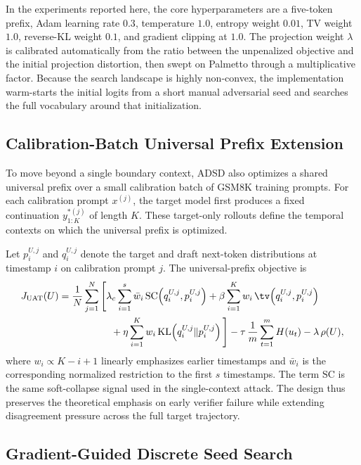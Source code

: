 In the experiments reported here, the core hyperparameters are a five-token
prefix, Adam learning rate $0.3$, temperature $1.0$, entropy weight $0.01$, TV
weight $1.0$, reverse-KL weight $0.1$, and gradient clipping at $1.0$. The
projection weight $\lambda$ is calibrated automatically from the ratio between
the unpenalized objective and the initial projection distortion, then swept on
Palmetto through a multiplicative factor. Because the search landscape is
highly non-convex, the implementation warm-starts the initial logits from a
short manual adversarial seed and searches the full vocabulary around that
initialization.

\subsection{Calibration-Batch Universal Prefix Extension}

To move beyond a single boundary context, ADSD also optimizes a shared
universal prefix over a small calibration batch of GSM8K training prompts. For
each calibration prompt $x^{(j)}$, the target model first produces a fixed
continuation $y^{*(j)}_{1:K}$ of length $K$. These target-only rollouts define
the temporal contexts on which the universal prefix is optimized.

Let $p_i^{U,j}$ and $q_i^{U,j}$ denote the target and draft next-token
distributions at timestamp $i$ on calibration prompt $j$. The universal-prefix
objective is
\begin{align*}
J_{\mathrm{UAT}}(U) ={}&
\frac{1}{N}\sum_{j=1}^{N}
\Bigg[
\lambda_c \sum_{i=1}^{s} \bar{w}_i\,
\mathrm{SC}\!\left(q_i^{U,j}, p_i^{U,j}\right)
+ \beta \sum_{i=1}^{K} w_i\,\tv\!\left(q_i^{U,j}, p_i^{U,j}\right)
\\
&\qquad\qquad
+ \eta \sum_{i=1}^{K} w_i\,\mathrm{KL}\!\left(q_i^{U,j} \Vert p_i^{U,j}\right)
\Bigg]
- \tau \,\frac{1}{m}\sum_{t=1}^{m} H(u_t)
- \lambda \,\rho(U),
\end{align*}
where $w_i \propto K-i+1$ linearly emphasizes earlier timestamps and
$\bar{w}_i$ is the corresponding normalized restriction to the first $s$
timestamps. The term $\mathrm{SC}$ is the same soft-collapse signal used in the
single-context attack. The design thus preserves the theoretical emphasis on
early verifier failure while extending disagreement pressure across the full
target trajectory.

\subsection{Gradient-Guided Discrete Seed Search}

